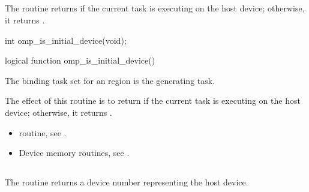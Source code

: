 \subsection{}
\label{subsec:omp_is_initial_device}
\summary
The  routine returns  if the current task is executing
on the host device; otherwise, it returns .

\begin{samepage}
\format
\begin{ccppspecific}
\begin{ompcFunction}
int omp_is_initial_device(void);
\end{ompcFunction}
\end{ccppspecific}
\end{samepage}

\begin{fortranspecific}
\begin{ompfFunction}
logical function omp_is_initial_device()
\end{ompfFunction}
\end{fortranspecific}

\binding
The binding task set for an  region is the generating task.

\effect
The effect of this routine is to return  if the current task is executing on the host
device; otherwise, it returns .

\crossreferences
\begin{itemize}


\item {} routine, see
.

\item Device memory routines, see .
\end{itemize}





\subsection{}
\label{subsec:omp_get_initial_device}
\summary
The  routine returns a device number representing
the host device.

